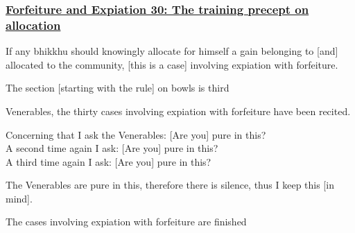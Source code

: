 \subsubsection*{\hyperref[np30]{Forfeiture and Expiation 30: The training precept on allocation}}
\label{forf-exp30}
If any bhikkhu should knowingly allocate for himself a gain belonging to [and] allocated to the community, [this is a case] involving expiation with forfeiture.

\begin{center}
  The section [starting with the rule] on bowls is third
\end{center}

\medskip

\begin{center}
Venerables, the thirty cases involving expiation with forfeiture have been recited.

\smallskip

Concerning that I ask the Venerables: [Are you] pure in this?\\
A second time again I ask: [Are you] pure in this?\\
A third time again I ask: [Are you] pure in this?

\smallskip

The Venerables are pure in this, therefore there is silence, thus I keep this [in mind].
\end{center}

\begin{outro}
  The cases involving expiation with forfeiture are finished
\end{outro}

\clearpage
